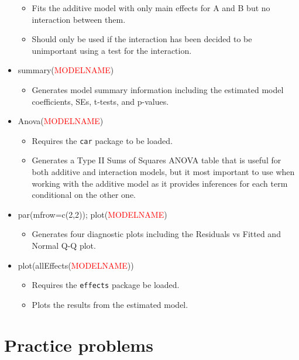 \documentclass[]{book}
\providecommand{\tightlist}{%
  \setlength{\itemsep}{0pt}\setlength{\parskip}{0pt}}
\theoremstyle{definition}
\theoremstyle{definition}
\theoremstyle{remark}
\begin{document}
\begin{itemize}
  \begin{itemize}
  \item
    Fits the additive model with only main effects for A and B but no
    interaction between them.
  \item
    Should only be used if the interaction has been decided to be
    unimportant using a test for the interaction.
  \end{itemize}
\item
  summary(\textcolor{red}{MODELNAME})

  \begin{itemize}
  \tightlist
  \item
    Generates model summary information including the estimated model
    coefficients, SEs, t-tests, and p-values.
  \end{itemize}
\item
  Anova(\textcolor{red}{MODELNAME})

  \begin{itemize}
  \item
    Requires the \texttt{car} package to be loaded.
  \item
    Generates a Type II Sums of Squares ANOVA table that is useful for
    both additive and interaction models, but it most important to use
    when working with the additive model as it provides inferences for
    each term conditional on the other one.
  \end{itemize}
\item
  par(mfrow=c(2,2)); plot(\textcolor{red}{MODELNAME})

  \begin{itemize}
  \tightlist
  \item
    Generates four diagnostic plots including the Residuals vs Fitted
    and Normal Q-Q plot.
  \end{itemize}
\item
  plot(allEffects(\textcolor{red}{MODELNAME}))

  \begin{itemize}
  \item
    Requires the \texttt{effects} package be loaded.
  \item
    Plots the results from the estimated model.
  \end{itemize}
\end{itemize}

\newpage

\section{Practice problems}\label{section4-9}
\end{document}
